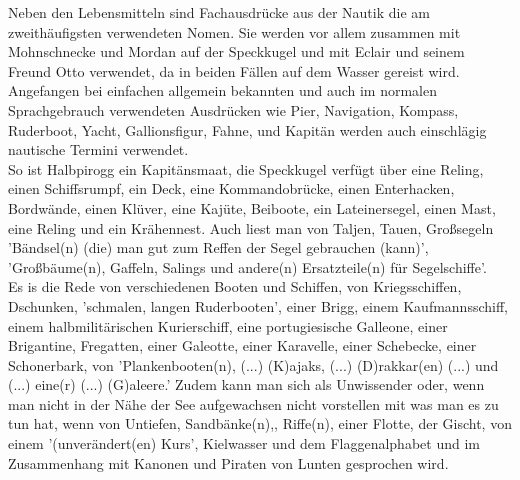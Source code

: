 Neben den Lebensmitteln sind Fachausdrücke aus der Nautik die am zweithäufigsten verwendeten Nomen.
Sie werden vor allem zusammen mit Mohnschnecke und Mordan auf der Speckkugel und mit Eclair und seinem Freund Otto verwendet, da in beiden Fällen auf dem Wasser gereist wird.
\\
Angefangen bei einfachen allgemein bekannten und auch im normalen Sprachgebrauch verwendeten Ausdrücken wie Pier,\cite[S.21]{pir} Navigation, \cite[S.138]{pir} Kompass,\cite[S.139]{pir} Ruderboot,\cite[S.21]{pir} Yacht,\cite[S.21]{pir} Gallionsfigur,\cite[S.30]{pir} Fahne, \cite[S.51]{pir} und Kapitän \cite[S.35]{pir} werden auch einschlägig nautische Termini verwendet.
\\
So ist Halbpirogg ein Kapitänsmaat,\cite[S.50]{pir} die Speckkugel verfügt über eine Reling, \cite[S.8]{pir} einen Schiffsrumpf,\cite[S.31]{pir} ein Deck,\cite[S.49]{pir} eine Kommandobrücke,\cite[S.53]{pir} einen Enterhacken,\cite[S.53]{pir} Bordwände,\cite[S.51]{pir} einen Klüver,\cite[S.51]{pir} eine Kajüte, \cite[S.55]{pir} Beiboote, \cite[S.56]{pir} ein Lateinersegel, \cite[S.56]{pir} einen Mast, \cite[S.56]{pir} eine Reling \cite[S.57]{pir}  und ein Krähennest. \cite[S.95]{pir} Auch liest man von Taljen, \cite[S.104]{pir} Tauen, \cite[S.104]{pir} Großsegeln \cite[S.105]{pir} 'Bändsel(n) (die) man gut zum Reffen der Segel gebrauchen (kann)',\cite[S.106]{pir} 'Großbäume(n), Gaffeln, Salings und andere(n) Ersatzteile(n) für Segelschiffe'. \cite[S.107]{pir}
\\
Es is die Rede von verschiedenen Booten und Schiffen, von Kriegsschiffen, \cite[S.7]{pir} Dschunken, \cite[S.8]{pir} 'schmalen, langen Ruderbooten', \cite[S.8]{pir} einer Brigg, \cite[S.35]{pir} einem Kaufmannsschiff, \cite[S.57]{pir} einem halbmilitärischen Kurierschiff, \cite[S.94]{pir} eine portugiesische Galleone, \cite[S.94]{pir} einer Brigantine, \cite[S.105]{pir} Fregatten, \cite[S.443]{pir} einer Galeotte, \cite[S.406]{pir} einer Karavelle, \cite[S.35]{pir} einer Schebecke, \cite[S.406]{pir} einer Schonerbark, \cite[S.406]{pir} von 'Plankenbooten(n), (...) (K)ajaks, (...) (D)rakkar(en) (...) und (...) eine(r) (...) (G)aleere.' \cite[S.407]{pir} Zudem kann man sich als Unwissender oder, wenn man nicht in der Nähe der See aufgewachsen nicht vorstellen mit was man es zu tun hat, wenn von Untiefen,\cite[S.7]{pir} Sandbänke(n),\cite[S.7]{pir}, Riffe(n),\cite[S.7]{pir} einer Flotte, \cite[S.8]{pir} der Gischt,\cite[S.51]{pir} von einem '(unverändert(en) Kurs',\cite[S.313]{pir} Kielwasser \cite[S.404]{pir} und dem Flaggenalphabet \cite[S.407]{pir} und im Zusammenhang mit Kanonen und Piraten von Lunten\cite[S.51]{pir} gesprochen wird.

